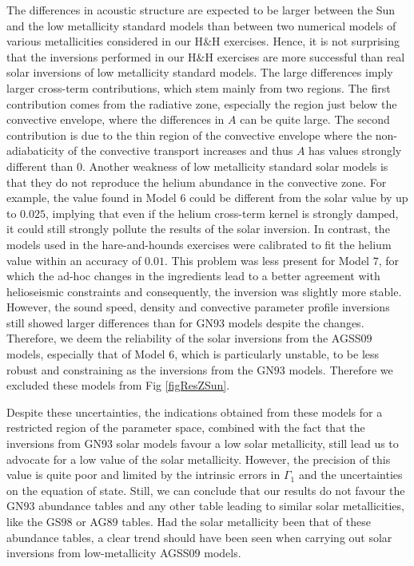 \documentclass[a4paper,fleqn,usenatbib]{mnras}
\begin{document}
The differences in  acoustic  structure  are expected to be larger  between  the Sun and  the  low  metallicity  standard  models  than  between two numerical models of various metallicities considered in our H$\&$H exercises. Hence, it is not surprising that the inversions performed in our H$\&$H exercises are more successful than real solar inversions of low metallicity standard models. The large differences imply larger cross-term contributions, which stem mainly from two regions. The first contribution comes from the radiative zone, especially the region just below the convective envelope, where the differences in $A$ can be quite large. The second contribution is due to the thin region of the convective envelope where the non-adiabaticity of the convective transport increases and thus $A$ has values strongly different than $0$. Another weakness of low metallicity standard solar models is that they do not reproduce the helium abundance in the convective zone. For example, the value found in Model $6$ could be different from the solar value by up to $0.025$, implying that even if the helium cross-term kernel is strongly damped, it could still strongly pollute the results of the solar inversion. In contrast, the models used in the hare-and-hounds exercises were calibrated to fit the helium value within an accuracy of $0.01$. This problem was less present for Model $7$, for which the ad-hoc changes in the ingredients lead to a better agreement with helioseismic constraints and consequently, the inversion was slightly more stable. However, the sound speed, density and convective parameter profile inversions still showed larger differences than for GN$93$ models despite the changes. Therefore, we deem the reliability of the solar inversions from the AGSS$09$ models, especially that of Model $6$, which is particularly unstable, to be less robust and constraining as the inversions from the GN$93$ models. Therefore we excluded these models from Fig \ref{figResZSun}.


Despite these uncertainties, the indications obtained from these models for a restricted region of the parameter space, combined with the fact that the inversions from GN$93$ solar models favour a low solar metallicity, still lead us to advocate for a low value of the solar metallicity. However, the precision of this value is quite poor and limited by the intrinsic errors in $\Gamma_{1}$ and the uncertainties on the equation of state. Still, we can conclude that our results do not favour the GN$93$ abundance tables and any other table leading to similar solar metallicities, like the GS$98$ or AG$89$ tables. Had the solar metallicity been that of these abundance tables, a clear trend should have been seen when carrying out solar inversions from low-metallicity AGSS$09$ models. 
\end{document}
